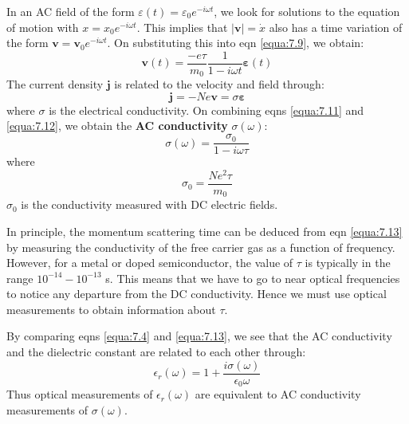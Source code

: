 \documentclass[12pt]{book}
\begin{document}
In an AC field of the form $\varepsilon(t) = \varepsilon_0e^{-i\omega t}$, we look for solutions to the equation of motion with $x = x_0e^{-i\omega t}$. This implies that $|\mathbf{v}|= \dot{x}$ also has a time variation of the form $\mathbf{v} = \mathbf{v}_0e^{-i\omega t}$. On substituting this into eqn \ref{equa:7.9}, we obtain:
\begin{equation}\label{equa:7.11}
  \mathbf{v}(t)=\frac{-e\tau}{m_0}\frac{1}{1-i\omega t}\boldsymbol{\varepsilon}(t)
\end{equation}
The current density $\mathbf{j}$ is related to the velocity and field through:
\begin{equation}\label{equa:7.12}
  \mathbf{j}=-Ne\mathbf{v}=\sigma\boldsymbol{\varepsilon}
\end{equation}
where $\sigma$ is the electrical conductivity. On combining eqns \ref{equa:7.11} and \ref{equa:7.12}, we obtain the \textbf{AC conductivity} $\sigma(\omega)$:
\begin{equation}\label{equa:7.13}
  \sigma(\omega)=\frac{\sigma_0}{1-i\omega\tau}
\end{equation}
where
\begin{equation}\label{equa:7.14}
  \sigma_0=\frac{Ne^2\tau}{m_0}
\end{equation}
$\sigma_0$ is the conductivity measured with DC electric fields.

In principle, the momentum scattering time can be deduced from eqn \ref{equa:7.13} by measuring the conductivity of the free carrier gas as a function of frequency. However, for a metal or doped semiconductor, the value of $\tau$ is typically in the range $10^{-14}-10^{-13}$ s. This means that we have to go to near optical frequencies to notice any departure from the DC conductivity. Hence we must use optical measurements to obtain information about $\tau$.

By comparing eqns \ref{equa:7.4} and \ref{equa:7.13}, we see that the AC conductivity and the dielectric constant are related to each other through:
\begin{equation}\label{equa:7.15}
  \epsilon_r(\omega)=1+\frac{i\sigma(\omega)}{\epsilon_0\omega}
\end{equation}
Thus optical measurements of $\epsilon_r(\omega)$ are equivalent to AC conductivity measurements of $\sigma(\omega)$.
\end{document}
